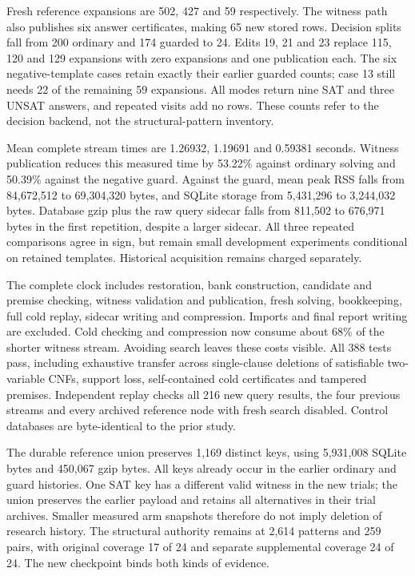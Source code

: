 \documentclass[11pt,a4paper]{article}
\numberwithin{equation}{section}
\theoremstyle{plain}
\theoremstyle{definition}
\theoremstyle{remark}
\begin{document}
Fresh reference expansions are 502, 427 and 59 respectively. The witness path
also publishes six answer certificates, making 65 new stored rows. Decision
splits fall from 200 ordinary and 174 guarded to 24. Edits 19, 21 and 23 replace
115, 120 and 129 expansions with zero expansions and one publication each.
The six negative-template cases retain exactly their earlier guarded counts;
case 13 still needs 22 of the remaining 59 expansions. All modes return nine
SAT and three UNSAT answers, and repeated visits add no rows. These counts
refer to the decision backend, not the structural-pattern inventory.

Mean complete stream times are 1.26932, 1.19691 and 0.59381 seconds. Witness
publication reduces this measured time by 53.22\% against ordinary solving and
50.39\% against the negative guard. Against the guard, mean peak RSS falls from
84,672,512 to 69,304,320 bytes, and SQLite storage from 5,431,296 to 3,244,032
bytes. Database gzip plus the raw query sidecar falls from 811,502 to 676,971
bytes in the first repetition, despite a larger sidecar. All three repeated
comparisons agree in sign, but remain small development experiments conditional
on retained templates. Historical acquisition remains charged separately.

The complete clock includes restoration, bank construction, candidate and
premise checking, witness validation and publication, fresh solving, bookkeeping,
full cold replay, sidecar writing and compression. Imports and final report
writing are excluded. Cold checking and compression now consume about 68\%
of the shorter witness stream. Avoiding search leaves these costs visible.
All 388 tests pass, including exhaustive transfer across single-clause deletions
of satisfiable two-variable CNFs, support loss, self-contained cold certificates
and tampered premises. Independent replay checks all 216 new query results,
the four previous streams and every archived reference node with fresh search
disabled. Control databases are byte-identical to the prior study.

The durable reference union preserves 1,169 distinct keys, using 5,931,008 SQLite
bytes and 450,067 gzip bytes. All keys already occur in the earlier ordinary and
guard histories. One SAT key has a different valid witness in the new trials;
the union preserves the earlier payload and retains all alternatives in their
trial archives. Smaller measured arm snapshots therefore do not imply deletion
of research history. The structural authority remains at 2,614 patterns and
259 pairs, with original coverage 17 of 24 and separate supplemental coverage
24 of 24. The new checkpoint binds both kinds of evidence.
\end{document}
